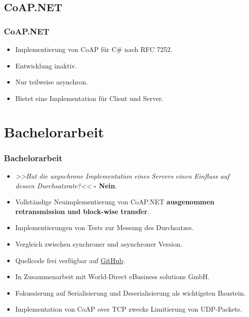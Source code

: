 \documentclass[11pt,t,usepdftitle=false,aspectratio=169,usenames,dvipsnames]{beamer}
\begin{document}
    \subsection{CoAP.NET}
    \begin{frame}
        \frametitle{CoAP.NET}
        \begin{itemize}
            \item<1-> Implementierung von CoAP für C\# nach RFC 7252.
            \item<2-> Entwicklung inaktiv.
            \item<3-> Nur teilweise asynchron.
            \item<4-> Bietet eine Implementation für Client und Server.
        \end{itemize}
    \end{frame}

    \section{Bachelorarbeit}
    \begin{frame}
        \frametitle{Bachelorarbeit}

        \begin{itemize}
            \item<1-> \textcolor{uibkblue}{\textit{>>Hat die asynchrone Implementation eines Servers einen Einfluss auf dessen Durchsatzrate?<<}}  \textbf{- \textcolor{uibkblue}{\textbf{Nein}}}.
            \item<3-> Vollständige Neuimplementierung von CoAP.NET \textbf{\textcolor{uibkblue}{ausgenommen retransmission und block-wise transfer}}.
            \item<5-> Implementierungen von Tests zur Messung des Durchsatzes.
            \item<6-> Vergleich zwischen synchroner und asynchroner Version.
            \item<7-> Quellcode frei verfügbar auf \href{https://github.com/world-direct/CoAP.NET}{GitHub}.
            \item<8-> In Zusammenarbeit mit World-Direct eBusiness solutions GmbH.
            \item<9-> Fokussierung auf Serialisierung und Deserialisierung als wichtigsten Baustein.
            \item<10-> Implementation von CoAP over TCP zwecks Limitierung von UDP-Packets.
        \end{itemize}
    \end{frame}
\end{document}
